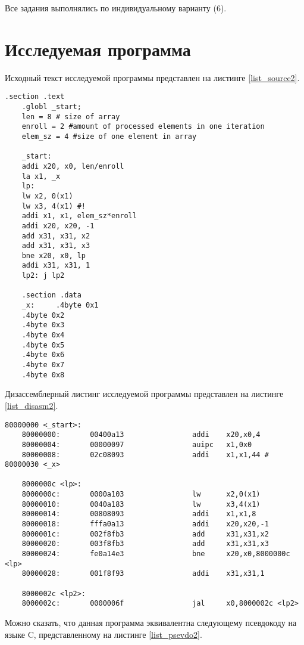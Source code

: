 Все задания выполнялись по индивидуальному варианту (6).

\section*{Исследуемая программа}

Исходный текст исследуемой программы  представлен на листинге \ref{list_source2}.

\begin{lstlisting}[caption=Исходный текст исследуемой программы,
	label={list_source2}]
	.section .text
	.globl _start;
	len = 8 # size of array 
	enroll = 2 #amount of processed elements in one iteration
	elem_sz = 4 #size of one element in array
	
	_start:
	addi x20, x0, len/enroll
	la x1, _x
	lp:
	lw x2, 0(x1)
	lw x3, 4(x1) #!
	addi x1, x1, elem_sz*enroll
	addi x20, x20, -1
	add x31, x31, x2
	add x31, x31, x3
	bne x20, x0, lp
	addi x31, x31, 1
	lp2: j lp2
	
	.section .data
	_x:     .4byte 0x1
	.4byte 0x2
	.4byte 0x3
	.4byte 0x4
	.4byte 0x5
	.4byte 0x6
	.4byte 0x7
	.4byte 0x8
\end{lstlisting}

\clearpage
Дизассемблерный листинг исследуемой программы  представлен на листинге \ref{list_disasm2}.


\begin{lstlisting}[caption=Дизассемблерный листинг исследуемой программы,
	label={list_disasm2}]
	80000000 <_start>:
	80000000:       00400a13                addi    x20,x0,4
	80000004:       00000097                auipc   x1,0x0
	80000008:       02c08093                addi    x1,x1,44 # 80000030 <_x>
	
	8000000c <lp>:
	8000000c:       0000a103                lw      x2,0(x1)
	80000010:       0040a183                lw      x3,4(x1)
	80000014:       00808093                addi    x1,x1,8
	80000018:       fffa0a13                addi    x20,x20,-1
	8000001c:       002f8fb3                add     x31,x31,x2
	80000020:       003f8fb3                add     x31,x31,x3
	80000024:       fe0a14e3                bne     x20,x0,8000000c <lp>
	80000028:       001f8f93                addi    x31,x31,1
	
	8000002c <lp2>:
	8000002c:       0000006f                jal     x0,8000002c <lp2>
\end{lstlisting}

\clearpage
Можно сказать, что данная программа эквивалентна следующему псевдокоду на языке C, представленному на листинге \ref{list_psevdo2}.


